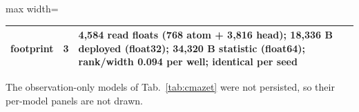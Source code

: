 \documentclass{article} %
\begin{document}
\begin{table}[h]
\begin{adjustbox}{max width=\linewidth}
\begin{tabular}{p{1.9cm}p{1.2cm}p{10.0cm}}
footprint & 3 & 4,584 read floats (768 atom + 3,816 head); 18,336 B deployed (float32); 34,320 B statistic (float64); rank/width 0.094 per well; identical per seed \\
\bottomrule
\end{tabular}\end{adjustbox}
\end{table}

\noindent The observation-only models of Tab.~\ref{tab:cmazet} were not persisted, so their per-model panels are not drawn.
\end{document}
